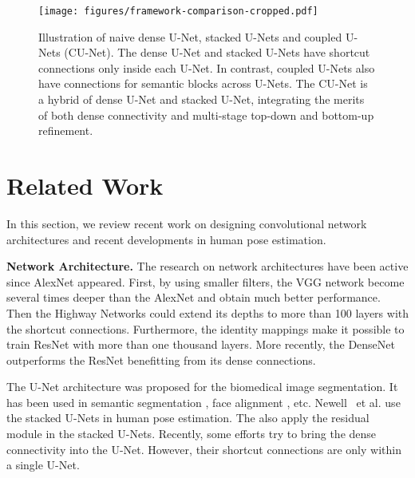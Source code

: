 \documentclass{bmvc2k}
\begin{document}
\begin{figure*}[t!]
\centering
  \texttt{[image: figures/framework-comparison-cropped.pdf]}
\caption{Illustration of naive dense U-Net, stacked U-Nets and coupled U-Nets (CU-Net). The dense U-Net and stacked U-Nets have shortcut connections only inside each U-Net. In contrast, coupled U-Nets also have connections for semantic blocks across U-Nets. The CU-Net is a hybrid of dense U-Net and stacked U-Net, integrating the merits of both dense connectivity and multi-stage top-down and bottom-up refinement.}
\label{fig:framework}
\end{figure*}



































%
 \section{Related Work}
In this section, we review recent work on designing convolutional network architectures and recent developments in human pose estimation.


{\bf Network Architecture.}
The research on network architectures have been active since
AlexNet \cite{alex2012alexnet} appeared. First, by using smaller filters, the VGG \cite{simonyan2014very} network become several times deeper than the AlexNet and obtain much better performance. Then the Highway Networks \cite{srivastava2015training} could extend its depths to more than 100 layers with the shortcut connections. Furthermore, the identity mappings make it possible to train ResNet \cite{he2016deep} with more than one thousand layers. More recently, the DenseNet \cite{huang2016densely} outperforms the ResNet benefitting from its dense connections.

The U-Net \cite{ronneberger2015u} architecture was proposed for the biomedical image segmentation. It has been used in semantic segmentation \cite{long2015fully}, face alignment  \cite{peng2016recurrent}, etc. Newell {\ et al.} \cite{newell2016stacked} use the stacked U-Nets in human pose estimation. The also apply the residual module \cite{he2016deep} in the stacked U-Nets. Recently, some efforts \cite{jegou2017one, li2017h} try to bring the dense connectivity \cite{huang2016densely} into the U-Net. However, their shortcut connections are only within a single U-Net.
\end{document}
